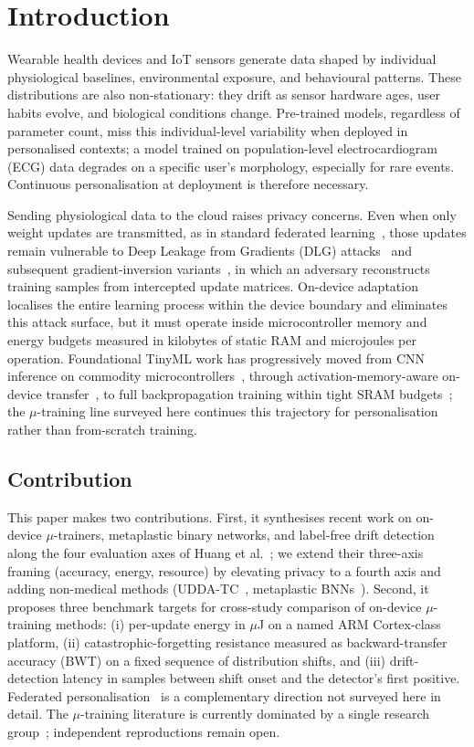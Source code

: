\documentclass[conference]{IEEEtran}
\begin{document}
\section{Introduction}
\label{sec:intro}

Wearable health devices and IoT sensors generate data shaped by
individual physiological baselines, environmental exposure, and
behavioural patterns. These distributions are also non-stationary:
they drift as sensor hardware ages, user habits evolve, and
biological conditions change. Pre-trained models, regardless of
parameter count, miss this individual-level variability when
deployed in personalised contexts; a model trained on
population-level electrocardiogram (ECG) data degrades on a
specific user's morphology, especially for rare events. Continuous
personalisation at deployment is therefore necessary.

Sending physiological data to the cloud raises privacy concerns.
Even when only weight updates are transmitted, as in standard
federated learning~\cite{FedAvg}, those updates remain vulnerable
to Deep Leakage from Gradients (DLG) attacks~\cite{b8} and
subsequent gradient-inversion variants~\cite{Geiping}, in which
an adversary reconstructs training samples from intercepted
update matrices. On-device adaptation localises the entire learning
process within the device boundary and eliminates this attack
surface, but it must operate inside microcontroller memory and
energy budgets measured in kilobytes of static RAM and microjoules
per operation. Foundational TinyML work has progressively
moved from CNN inference on commodity microcontrollers~\cite{MCUNet},
through activation-memory-aware on-device transfer~\cite{TinyTL},
to full backpropagation training within tight SRAM
budgets~\cite{TinyTrainEng}; the $\mu$-training line surveyed
here continues this trajectory for personalisation rather than
from-scratch training.

\subsection{Contribution}

This paper makes two contributions. First, it synthesises recent
work on on-device $\mu$-trainers, metaplastic binary networks,
and label-free drift detection along the four evaluation axes of
Huang et al.~\cite{b1}; we extend their three-axis framing
(accuracy, energy, resource) by elevating privacy to a fourth
axis and adding non-medical methods (UDDA-TC~\cite{b6}, metaplastic
BNNs~\cite{b9}). Second, it proposes three benchmark targets for cross-study comparison
of on-device $\mu$-training methods: (i) per-update energy in
$\mu$J on a named ARM Cortex-class platform, (ii) catastrophic-forgetting
resistance measured as backward-transfer accuracy (BWT)
on a fixed sequence of distribution shifts, and (iii)
drift-detection latency in samples between shift onset and the
detector's first positive. Federated personalisation~\cite{b4} is
a complementary direction not surveyed here in detail. The
$\mu$-training literature is currently dominated by a single
research group~\cite{b1,b3,b13}; independent reproductions remain
open.
\end{document}
